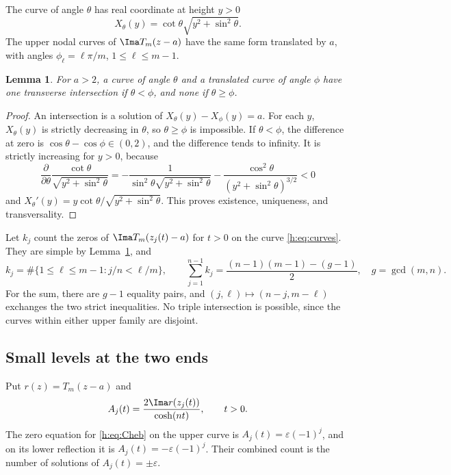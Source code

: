 \documentclass[UTF8,11pt]{ctexart}
\newtheorem{lem}[thm]{Lemma}
\theoremstyle{definition}
\numberwithin{equation}{section}
\newcommand{\eps}{\varepsilon}\newcommand{\ep}{\varepsilon}
\begin{document}
The curve of angle $\theta$ has real coordinate at height $y>0$
\[
 X_\theta(y)=\cot\theta\sqrt{y^2+\sin^2\theta}.
\]
The upper nodal curves of $\Ima T_m(z-a)$ have the same form translated
by $a$, with angles $\phi_\ell=\ell\pi/m$, $1\le\ell\le m-1$.
\begin{lem}\label{h:lem:crossings}
For $a>2$, a curve of angle $\theta$ and a translated curve of angle
$\phi$ have one transverse intersection if $\theta<\phi$, and none
if $\theta\ge\phi$.
\end{lem}
\begin{proof}
An intersection is a solution of $X_\theta(y)-X_\phi(y)=a$.
For each $y$, $X_\theta(y)$ is strictly decreasing in $\theta$, so
$\theta\ge\phi$ is impossible. If $\theta<\phi$, the difference at zero
is $\cos\theta-\cos\phi\in(0,2)$, and the difference tends to infinity.
It is strictly increasing for $y>0$, because
\[
 \frac{\partial}{\partial\theta}
 \frac{\cot\theta}{\sqrt{y^2+\sin^2\theta}}
 =-\frac{1}{\sin^2\theta\sqrt{y^2+\sin^2\theta}}
  -\frac{\cos^2\theta}{(y^2+\sin^2\theta)^{3/2}}<0
\]
and $X_\theta'(y)=y\cot\theta/\sqrt{y^2+\sin^2\theta}$.
This proves existence, uniqueness, and transversality.
\end{proof}

Let $k_j$ count the zeros of $\Ima T_m(z_j(t)-a)$ for $t>0$ on the curve
\eqref{h:eq:curves}. They are simple by Lemma~\ref{h:lem:crossings}, and
\begin{equation}\label{h:eq:kj}
 k_j=\#\{1\le\ell\le m-1:j/n<\ell/m\},
 \qquad
 \sum_{j=1}^{n-1}k_j
 =\frac{(n-1)(m-1)-(g-1)}2,
 \quad g=\gcd(m,n).
\end{equation}
For the sum, there are $g-1$ equality pairs, and
$(j,\ell)\mapsto(n-j,m-\ell)$ exchanges the two strict inequalities.
No triple intersection is possible, since the curves within either
upper family are disjoint.

\subsection{Small levels at the two ends}
Put $r(z)=T_m(z-a)$ and
\[
 A_j(t)=\frac{2\Ima r(z_j(t))}{\cosh(nt)},\qquad t>0.
\]
The zero equation for \eqref{h:eq:Cheb} on the upper curve is
$A_j(t)=\eps(-1)^j$, and on its lower reflection it is
$A_j(t)=-\eps(-1)^j$. Their combined count is the number of solutions of
$A_j(t)=\pm\eps$.
\end{document}
